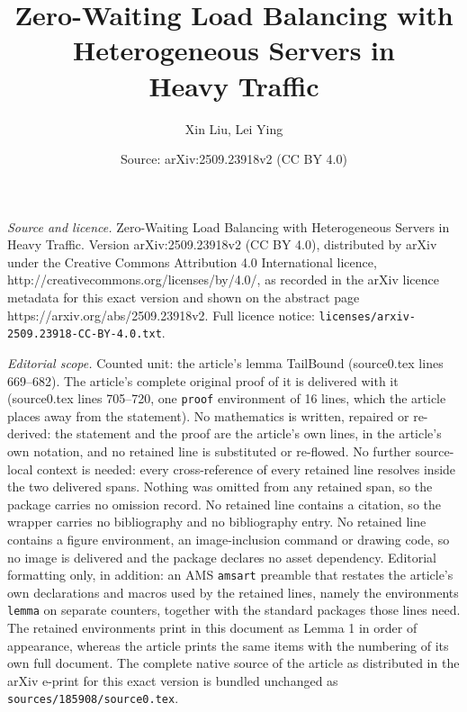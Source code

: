\documentclass[10pt,a4paper]{amsart}
\title{Zero-Waiting Load Balancing with Heterogeneous Servers in \\ Heavy Traffic}
\author{Xin Liu, Lei Ying}
\date{Source: arXiv:2509.23918v2 (CC BY 4.0)}
\begin{document}
\maketitle

\noindent\emph{Source and licence.} Zero-Waiting Load Balancing with Heterogeneous Servers in \\ Heavy Traffic. Version arXiv:2509.23918v2 (CC BY 4.0), distributed by arXiv under the Creative Commons Attribution 4.0 International licence, http://creativecommons.org/licenses/by/4.0/, as recorded in the arXiv licence metadata for this exact version and shown on the abstract page https://arxiv.org/abs/2509.23918v2. Full licence notice: \texttt{licenses/arxiv-2509.23918-CC-BY-4.0.txt}.\par\smallskip

\noindent\textit{Editorial scope.} Counted unit: the article's lemma TailBound (source0.tex lines 669--682). The article's complete original proof of it is delivered with it (source0.tex lines 705--720, one \texttt{proof} environment of 16 lines, which the article places away from the statement). No mathematics is written, repaired or re-derived: the statement and the proof are the article's own lines, in the article's own notation, and no retained line is substituted or re-flowed.  No further source-local context is needed: every cross-reference of every retained line resolves inside the two delivered spans.  Nothing was omitted from any retained span, so the package carries no omission record.  No retained line contains a citation, so the wrapper carries no bibliography and no bibliography entry.  No retained line contains a figure environment, an image-inclusion command or drawing code, so no image is delivered and the package declares no asset dependency.  Editorial formatting only, in addition: an AMS \texttt{amsart} preamble that restates the article's own declarations and macros used by the retained lines, namely the environments \texttt{lemma} on separate counters, together with the standard packages those lines need.  The retained environments print in this document as Lemma 1 in order of appearance, whereas the article prints the same items with the numbering of its own full document.  The complete native source of the article as distributed in the arXiv e-print for this exact version is bundled unchanged as \texttt{sources/185908/source0.tex}.
\end{document}
